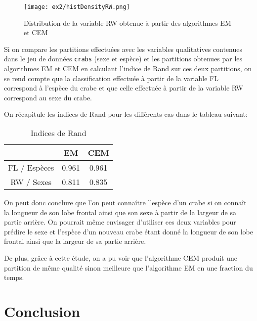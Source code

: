 \documentclass{article}
\begin{document}
\begin{multicols}{2}
\begin{figure}[H]
\begin{center}
    \texttt{[image: ex2/histDensityRW.png]}
    \centering
    \captionsetup{justification=centering}
    \caption{\label{fig:histDRW}Distribution de la variable RW obtenue à partir des algorithmes EM et CEM}
\end{center}
\end{figure}

Si on compare les partitions effectuées avec les variables qualitatives
contenues dans le jeu de données \texttt{crabs} (sexe et espèce) et les
partitions obtenues par les algorithmes EM et CEM en calculant
l'indice de Rand sur ces deux partitions, on se rend compte que la
classification effectuée à partir de la variable FL correspond à l'espèce du
crabe et que celle effectuée à partir de la variable RW correspond au sexe du
crabe.

On récapitule les indices de Rand pour les différents cas dans le tableau
suivant:

\begin{table}[H]
\centering
\captionsetup{justification=centering}
\caption{\label{tab:rands}Indices de Rand}
\begin{tabular}{|c|c|c|}
    \hline
    & EM & CEM \\
    \hline
    FL / Espèces & 0.961 & 0.961 \\
    \hline
    RW / Sexes & 0.811 & 0.835 \\
    \hline
\end{tabular}
\end{table}

On peut donc conclure que l'on peut connaître l'espèce d'un crabe si on connaît
la longueur de son lobe frontal ainsi que son sexe à partir de la largeur de sa
partie arrière. On pourrait même envisager d'utiliser ces deux variables pour
prédire le sexe et l'espèce d'un nouveau crabe étant donné la longueur de son
lobe frontal ainsi que la largeur de sa partie arrière.

De plus, grâce à cette étude, on a pu voir que l'algorithme CEM produit une
partition de même qualité sinon meilleure que l'algorithme EM en une fraction du
temps.


\section{Conclusion}\label{sec:conclu}


\end{multicols}
\end{document}
